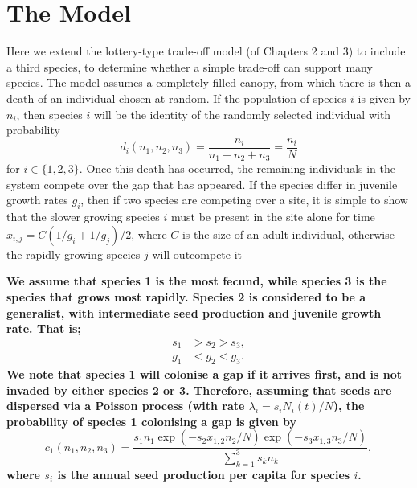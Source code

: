 \section{The Model}
Here we extend the lottery-type trade-off model (of Chapters 2 and 3) to include a third species, to determine whether a simple trade-off can support many species. The model assumes a completely filled canopy, from which there is then a death of an individual chosen at random. If the population of species $i$ is given by $n_i$, then species $i$ will be the identity of the randomly selected individual with probability
\begin{equation}
\label{d}
d_i(n_1,n_2,n_3)=\frac{n_i}{n_1+n_2+n_3}=\frac{n_i}{N} \end{equation}
for $i \in \{1,2,3\}$. Once this death has occurred, the remaining individuals in the system compete over the gap that has appeared. If the species differ in juvenile growth rates $g_i$, then if two species are competing over a site, it is simple to show that the slower growing species $i$ must be present in the site alone for time $x_{i,j}=C(1/g_i +1/g_j)/2$, where $C$ is the size of an adult individual, otherwise the rapidly growing species $j$ will outcompete it

\textbf{We assume that species 1 is the most fecund, while species 3 is the species that grows most rapidly. Species 2 is considered to be a generalist, with intermediate seed production and juvenile growth rate. That is;
\begin{align}
s_1&>s_2>s_3,\\
g_1&<g_2<g_3.
\end{align}
We note that species 1 will colonise a gap if it arrives first, and is not invaded by either species 2 or 3. Therefore, assuming that seeds are dispersed via a Poisson process (with rate $\lambda_i=s_iN_i(t)/N$), the probability of species 1 colonising a gap is given by
\begin{equation}
\label{c1}
c_1(n_1,n_2,n_3)=\frac{s_1 n_1 \exp(-s_2x_{1,2}n_2/N)\exp(-s_3x_{1,3}n_3/N)}{\sum_{k=1}^3 s_k n_k},\end{equation}
where $s_i$ is the annual seed production per capita for species $i$.}

